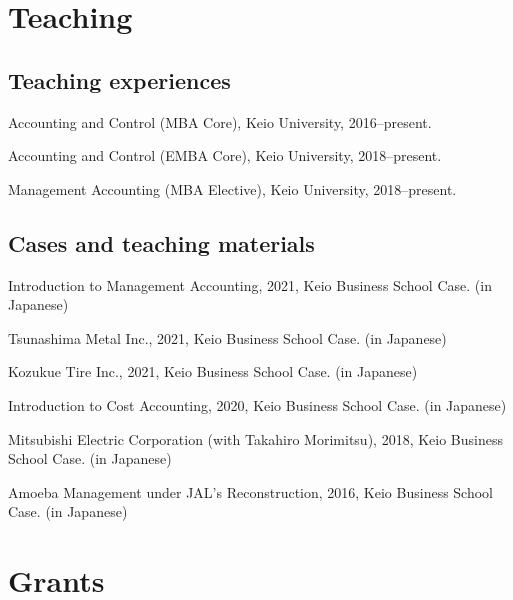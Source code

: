 \documentclass[letterpaper,uplatex]{article}
\renewenvironment{itemize}{
  \begin{list}{}{
    \setlength{\leftmargin}{1.5em}
  }
}{
  \end{list}
}
\begin{document}
\section*{Teaching}

\subsection*{Teaching experiences}

\begin{itemize}
	\item Accounting and Control (MBA Core), Keio University, 2016--present.
	\item Accounting and Control (EMBA Core), Keio University, 2018--present.
	\item Management Accounting (MBA Elective), Keio University, 2018--present.
\end{itemize}

\subsection*{Cases and teaching materials}

\begin{itemize}
    \item Introduction to Management Accounting, 2021, Keio Business School Case. (in Japanese)
    \item Tsunashima Metal Inc., 2021, Keio Business School Case. (in Japanese)
    \item Kozukue Tire Inc., 2021, Keio Business School Case. (in Japanese)
   \item Introduction to Cost Accounting, 2020, Keio Business School Case. (in Japanese)
   \item Mitsubishi Electric Corporation (with Takahiro Morimitsu), 2018, Keio Business School Case. (in Japanese)
   \item Amoeba Management under JAL's Reconstruction, 2016, Keio Business School Case. (in Japanese)
\end{itemize}

\section*{Grants}
\end{document}
